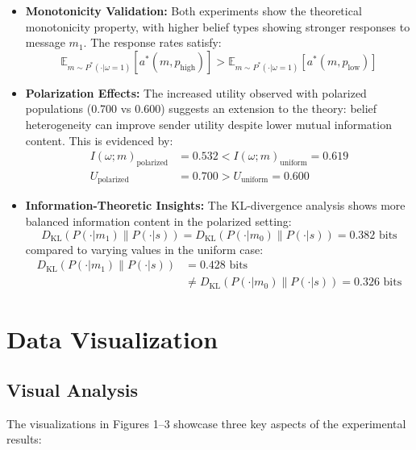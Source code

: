 \documentclass[12pt]{article}
\theoremstyle{plain}
\theoremstyle{definition}
\theoremstyle{remark}
\begin{document}
\begin{itemize}
    \item \textbf{Monotonicity Validation:} Both experiments show the theoretical monotonicity property, with higher belief types showing stronger responses to message $m_1$. The response rates satisfy:
    \[\mathbb{E}_{m\sim P^*(\cdot|\omega=1)} [a^*(m,p_{\text{high}})] > \mathbb{E}_{m\sim P^*(\cdot|\omega=1)} [a^*(m,p_{\text{low}})]\]

    \item \textbf{Polarization Effects:} The increased utility observed with polarized populations (0.700 vs 0.600) suggests an extension to the theory: belief heterogeneity can improve sender utility despite lower mutual information content. This is evidenced by:
    \begin{align*}
        I(\omega;m)_{\text{polarized}} &= 0.532 < I(\omega;m)_{\text{uniform}} = 0.619 \\
        U_{\text{polarized}} &= 0.700 > U_{\text{uniform}} = 0.600
    \end{align*}

    \item \textbf{Information-Theoretic Insights:} The KL-divergence analysis shows more balanced information content in the polarized setting:
    \[D_{\text{KL}}(P(\cdot|m_1)\|P(\cdot|s)) = D_{\text{KL}}(P(\cdot|m_0)\|P(\cdot|s)) = 0.382 \text{ bits}\]
    compared to varying values in the uniform case:
    \begin{align*}
        D_{\text{KL}}(P(\cdot|m_1)\|P(\cdot|s)) &= 0.428 \text{ bits} \\
        &\neq D_{\text{KL}}(P(\cdot|m_0)\|P(\cdot|s)) = 0.326 \text{ bits}
    \end{align*}
\end{itemize}

\section{Data Visualization}

\subsection{Visual Analysis}

The visualizations in Figures 1--3 showcase three key aspects of the experimental results:
\end{document}
